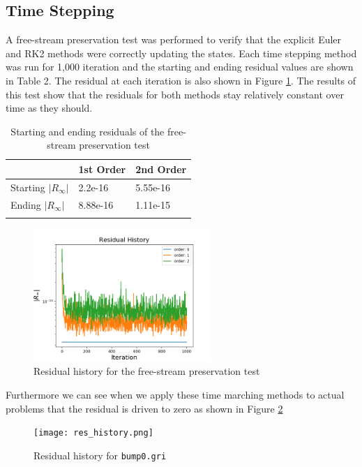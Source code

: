 \documentclass{article}
\begin{document}
\subsection{Time Stepping}
A free-stream preservation test was performed to verify that the explicit Euler and RK2 methods were correctly updating the states. Each time stepping method was run for 1,000 iteration and the starting and ending residual values are shown in Table 2.
The residual at each iteration is also shown in Figure \ref{fig:free_stream}. The results of this test show that the residuals for both methods stay relatively constant over time as they should.
\begin{table}[H]
	\label{tab:fsp}
	\begin{tabular}{@{}lll@{}}
	\toprule
		& 1st Order & 2nd Order \\ \midrule
		Starting $|R_{\infty}|$ & 2.2e-16  & 5.55e-16  \\
		Ending $|R_{\infty}|$ & 8.88e-16   & 1.11e-15  \\ \bottomrule
	\caption{Starting and ending residuals of the free-stream preservation test}

	\end{tabular}
\end{table}

\begin{figure}[H]
	\centering
	\includegraphics[width=0.60\textwidth,keepaspectratio]{freestream.png}
	\caption{Residual history for the free-stream preservation test}
	\label{fig:free_stream}
\end{figure}


Furthermore we can see when we apply these time marching methods to actual problems that the residual is driven to zero as shown in Figure \ref{fig:res_history}
\begin{figure}[H]
	\centering
	\texttt{[image: res\_history.png]}
	\caption{Residual history for \texttt{bump0.gri}}
	\label{fig:res_history}
\end{figure}
\end{document}
